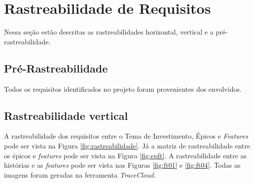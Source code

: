 \section[Rastreabilidade de Requisitos]{Rastreabilidade de Requisitos}

Nessa seção estão descritas as rastreabilidades horizontal, vertical e a pré-rastreabilidade.


\subsection{Pré-Rastreabilidade}

Todos os requisitos identificados no projeto foram provenientes dos envolvidos.

% 
% 
% 
% 
% 
% 

\subsection{Rastreabilidade vertical}
A rastreabilidade dos requisitos entre o Tema de Investimento, Épicos e \textit{Features} pode ser vista na Figura \ref{fig:rastreabilidade}.
Já a matriz de rastreabilidade entre os épicos e \textit{features} pode ser vista na Figura \ref{fig:epft}. A rastreabilidade
entre as histórias e as \textit{features} pode ser vista nas Figuras \ref{fig:ft01} e \ref{fig:ft04}. Todas as imagens foram geradas
na ferramenta \textit{TraceCloud}. \footnotemark

